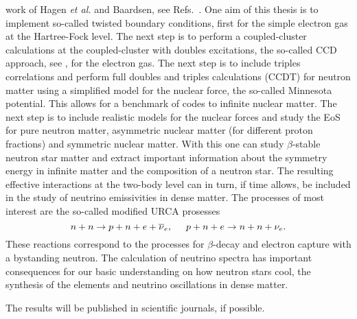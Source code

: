 \documentclass[aps,prc,twocolumn,showpacs,floatfix,nofootinbib,preprintnumbers,superscriptaddress,amsmath,amssymb]{revtex4-1}
\begin{document}
work of Hagen {\em et al.} and Baardsen, see Refs.~\cite{hagen2014,baardsen2014}. 
One aim 
of this thesis is to implement so-called twisted boundary conditions,
first for the simple electron gas at the Hartree-Fock level. 
The next
step is to perform a coupled-cluster calculations at the
coupled-cluster with doubles excitations, the so-called CCD approach,
see \cite{shavittbartlett2009}, for the electron gas.  The next step
is to include triples correlations and perform full doubles and
triples calculations (CCDT) for neutron matter using a simplified model for the nuclear force, the so-called Minnesota potential. 
This allows for a benchmark of codes to infinite nuclear matter. The next step is to include realistic models for the nuclear forces and 
study the EoS for pure neutron matter, asymmetric
nuclear matter (for different proton fractions) and symmetric nuclear
matter. With this one can study $\beta$-stable neutron star matter and
extract important information about the symmetry energy in infinite
matter and the composition of a neutron star. 
The resulting effective interactions at the two-body level can in turn, if time allows, be included in the study of neutrino emissivities in dense matter. The processes of most interest are the so-called 
modified  URCA prosesses
\begin{equation}
    n+n\rightarrow p+n +e +\overline{\nu}_e,
    \hspace{0.5cm} p+n+e \rightarrow
    n+n+\nu_e .
    \label{eq:ind_neutr}
\end{equation}
These reactions correspond to the processes for 
$\beta$-decay and electron capture with a bystanding neutron.
The calculation of neutrino spectra has important consequences for our basic understanding on how neutron stars cool, the synthesis of the elements and neutrino oscillations in dense matter. 


The results will be published in scientific journals, if possible.
\end{document}
